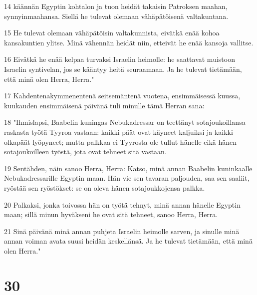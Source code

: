 \par 14 käännän Egyptin kohtalon ja tuon heidät takaisin Patroksen maahan, synnyinmaahansa. Siellä he tulevat olemaan vähäpätöisenä valtakuntana.
\par 15 He tulevat olemaan vähäpätöisin valtakunnista, eivätkä enää kohoa kansakuntien ylitse. Minä vähennän heidät niin, etteivät he enää kansoja vallitse.
\par 16 Eivätkä he enää kelpaa turvaksi Israelin heimolle: he saattavat muistoon Israelin syntivelan, jos se kääntyy heitä seuraamaan. Ja he tulevat tietämään, että minä olen Herra, Herra."
\par 17 Kahdentenakymmenentenä seitsemäntenä vuotena, ensimmäisessä kuussa, kuukauden ensimmäisenä päivänä tuli minulle tämä Herran sana:
\par 18 "Ihmislapsi, Baabelin kuningas Nebukadressar on teettänyt sotajoukoillansa raskasta työtä Tyyroa vastaan: kaikki päät ovat käyneet kaljuiksi ja kaikki olkapäät lyöpyneet; mutta palkkaa ei Tyyrosta ole tullut hänelle eikä hänen sotajoukoilleen työstä, jota ovat tehneet sitä vastaan.
\par 19 Sentähden, näin sanoo Herra, Herra: Katso, minä annan Baabelin kuninkaalle Nebukadressarille Egyptin maan. Hän vie sen tavaran paljouden, saa sen saaliit, ryöstää sen ryöstökset: se on oleva hänen sotajoukkojensa palkka.
\par 20 Palkaksi, jonka toivossa hän on työtä tehnyt, minä annan hänelle Egyptin maan; sillä minun hyväkseni he ovat sitä tehneet, sanoo Herra, Herra.
\par 21 Sinä päivänä minä annan puhjeta Israelin heimolle sarven, ja sinulle minä annan voiman avata suusi heidän keskellänsä. Ja he tulevat tietämään, että minä olen Herra."

\chapter{30}

